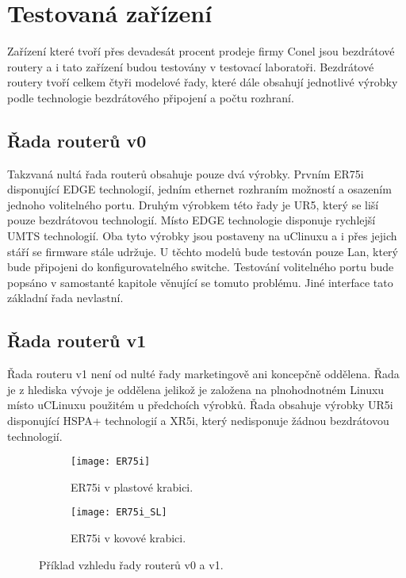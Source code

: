 \section{Testovaná zařízení}
Zařízení které tvoří přes devadesát procent prodeje firmy Conel jsou bezdrátové routery a i tato zařízení budou testovány v testovací laboratoři. Bezdrátové routery tvoří celkem čtyři modelové řady, které dále obsahují jednotlivé výrobky podle technologie bezdrátového připojení a počtu rozhraní.

\subsection{Řada routerů v0}
Takzvaná nultá řada routerů obsahuje pouze dvá výrobky. Prvním ER75i disponující EDGE technologií, jedním ethernet rozhraním možností a osazením jednoho volitelného portu.  Druhým výrobkem této řady je UR5, který se liší pouze bezdrátovou technologií. Místo EDGE technologie disponuje rychlejší UMTS technologií. Oba tyto výrobky jsou postaveny na uClinuxu a i přes jejich stáří se firmware stále udržuje. U těchto modelů bude testován pouze Lan, který bude připojeni do konfigurovatelného switche. Testování volitelného portu bude popsáno v samostanté kapitole věnující se tomuto problému. Jiné interface tato základní řada nevlastní.

\subsection{Řada routerů v1}
Řada routeru v1 není od nulté řady marketingově ani koncepčně oddělena. Řada je z hlediska vývoje je oddělena jelikož je založena na plnohodnotném Linuxu místo uCLinuxu použitém u předchoích výrobků. Řada obsahuje výrobky UR5i disponující HSPA+ technologií a XR5i, který nedisponuje žádnou bezdrátovou technologií.

\begin{figure}[h]
  \begin{subfigure}[h]{0.5\LW}
    \centering
    \texttt{[image: ER75i]}
    \caption{ER75i v plastové krabici.}
    \label{fig:ER75i}
  \end{subfigure}
  \begin{subfigure}[h]{0.5\LW}
    \centering
    \texttt{[image: ER75i\_SL]}
    \caption{ER75i v kovové krabici.}
    \label{fig:ER75i SL}
  \end{subfigure}
  \caption{Příklad vzhledu řady routerů v0 a v1.}
  \label{fig:ER75i}
\end{figure}

